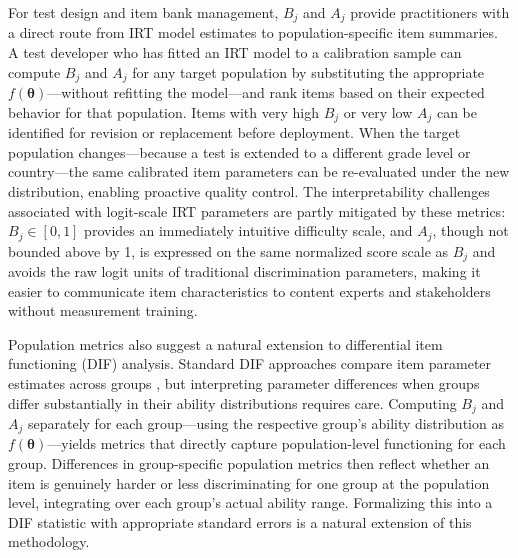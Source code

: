 \documentclass[man, 12pt, floatsintext]{apa7}
\begin{document}
For test design and item bank management, $B_j$ and $A_j$ provide practitioners with a direct route from IRT model estimates to population-specific item summaries. A test developer who has fitted an IRT model to a calibration sample can compute $B_j$ and $A_j$ for any target population by substituting the appropriate $f(\boldsymbol{\theta})$---without refitting the model---and rank items based on their expected behavior for that population. Items with very high $B_j$ or very low $A_j$ can be identified for revision or replacement before deployment. When the target population changes---because a test is extended to a different grade level or country---the same calibrated item parameters can be re-evaluated under the new distribution, enabling proactive quality control. The interpretability challenges associated with logit-scale IRT parameters \parencite{LudlowHaley1995, EkstrandEtAl2022} are partly mitigated by these metrics: $B_j \in [0, 1]$ provides an immediately intuitive difficulty scale, and $A_j$, though not bounded above by 1, is expressed on the same normalized score scale as $B_j$ and avoids the raw logit units of traditional discrimination parameters, making it easier to communicate item characteristics to content experts and stakeholders without measurement training.

Population metrics also suggest a natural extension to differential item functioning (DIF) analysis. Standard DIF approaches compare item parameter estimates across groups \parencite{HollandWainer1993}, but interpreting parameter differences when groups differ substantially in their ability distributions requires care. Computing $B_j$ and $A_j$ separately for each group---using the respective group's ability distribution as $f(\boldsymbol{\theta})$---yields metrics that directly capture population-level functioning for each group. Differences in group-specific population metrics then reflect whether an item is genuinely harder or less discriminating for one group at the population level, integrating over each group's actual ability range. Formalizing this into a DIF statistic with appropriate standard errors is a natural extension of this methodology.
\end{document}
